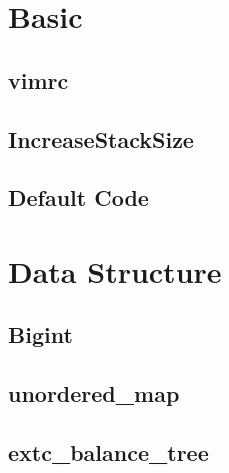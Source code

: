 \documentclass[10pt,twocolumn,oneside]{article}
\begin{document}
\pagestyle{fancy}
\fancyfoot{}
\fancyhead[R]{\thepage}
\renewcommand{\headrulewidth}{0.4pt}
\renewcommand{\contentsname}{Contents} 

\scriptsize
\tableofcontents

\newpage

\section{Basic}
\subsection{vimrc}


\subsection{IncreaseStackSize}


\subsection{Default Code}

\newpage

\section{Data Structure}
\subsection{Bigint}


% 

\subsection{unordered\_map}


\subsection{extc\_balance\_tree}

\end{document}
